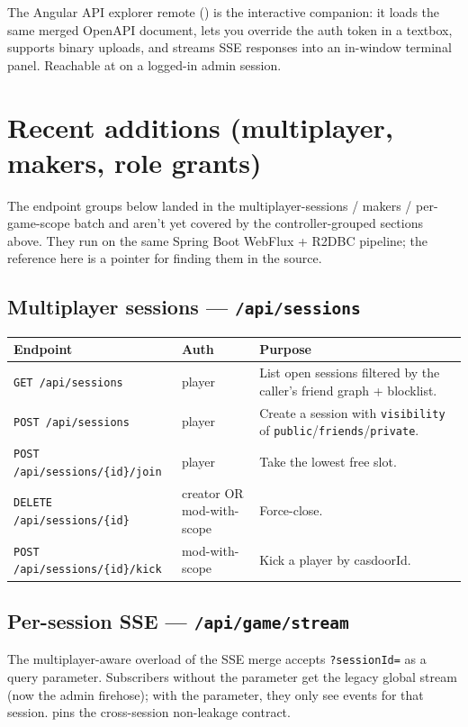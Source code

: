 \medskip

The Angular API explorer remote
() is the interactive
companion: it loads the same merged OpenAPI document, lets you
override the auth token in a textbox, supports binary uploads, and
streams SSE responses into an in-window terminal panel. Reachable at
 on a logged-in admin session.

\section{Recent additions (multiplayer, makers, role grants)}

The endpoint groups below landed in the multiplayer-sessions /
makers / per-game-scope batch and aren't yet covered by the
controller-grouped sections above. They run on the same Spring Boot
WebFlux + R2DBC pipeline; the reference here is a pointer for finding
them in the source.

\subsection{Multiplayer sessions --- \texttt{/api/sessions}}

\begin{tabularx}{\linewidth}{l l X}
\toprule
\textbf{Endpoint} & \textbf{Auth} & \textbf{Purpose} \\
\midrule
\texttt{GET /api/sessions} & player & List open sessions filtered by the
caller's friend graph + blocklist. \\
\texttt{POST /api/sessions} & player & Create a session with
\texttt{visibility} of \texttt{public}/\texttt{friends}/\texttt{private}. \\
\texttt{POST /api/sessions/\{id\}/join} & player & Take the lowest free slot. \\
\texttt{DELETE /api/sessions/\{id\}} & creator OR mod-with-scope & Force-close. \\
\texttt{POST /api/sessions/\{id\}/kick} & mod-with-scope & Kick a player by casdoorId. \\
\bottomrule
\end{tabularx}

\subsection{Per-session SSE --- \texttt{/api/game/stream}}

The multiplayer-aware overload of the SSE merge accepts
\texttt{?sessionId=} as a query parameter. Subscribers without the
parameter get the legacy global stream (now the admin firehose); with
the parameter, they only see events for that session.
 pins the cross-session non-leakage
contract.

